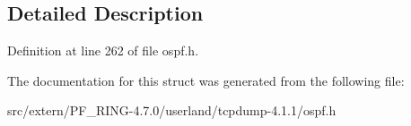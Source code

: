 \begin{DoxyCompactItemize}
\end{tabbing}\end{DoxyCompactItemize}


\subsection{Detailed Description}


Definition at line 262 of file ospf.h.



The documentation for this struct was generated from the following file:\begin{DoxyCompactItemize}
\item 
src/extern/PF\_\-RING-\/4.7.0/userland/tcpdump-\/4.1.1/ospf.h\end{DoxyCompactItemize}
